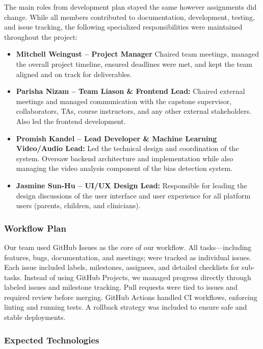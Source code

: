 \documentclass{article}
\begin{document}
The main roles from development plan stayed the same however assignments did change.
While all members contributed to documentation, development, testing, and issue tracking, the following specialized responsibilities were maintained throughout the project:

\begin{itemize}
    \item \textbf{Mitchell Weingust – Project Manager }  
    Chaired team meetings, managed the overall project timeline, ensured deadlines were met, and kept the team aligned and on track for deliverables.

    \item \textbf{Parisha Nizam – Team Liason \& Frontend Lead:}  
    Chaired external meetings and managed communication with the capstone supervisor, collaborators, TAs, course instructors, and any other external stakeholders. Also led the frontend development. 

    \item \textbf{Promish Kandel – Lead Developer \& Machine Learning Video/Audio Lead:}  
    Led the technical design and coordination of the system. Oversaw backend architecture and implementation while also managing the video analysis component of the bias detection system.

    \item \textbf{Jasmine Sun-Hu – UI/UX Design Lead:}  
    Responsible for leading the design discussions of the user interface and user experience for all platform users (parents, children, and clinicians).
\end{itemize}

\subsubsection{Workflow Plan}

Our team used GitHub Issues as the core of our workflow. All tasks—including features, bugs, documentation, and meetings; were tracked as individual issues. 
Each issue included labels, milestones, assignees, and detailed checklists for sub-tasks. Instead of using GitHub Projects, we managed progress directly through labeled issues and milestone tracking. Pull requests were tied to issues and required review before merging. GitHub Actions handled CI workflows, enforcing linting and running tests. A rollback strategy was included to ensure safe and stable deployments.

\subsubsection{Expected Technologies}
\end{document}
